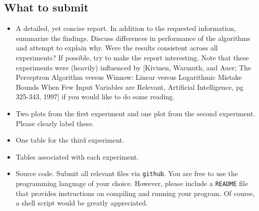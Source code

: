 \documentclass[12pt,letterpaper]{article}
\begin{document}
\begin{enumerate}
\end{enumerate}

\subsection*{What to submit}

\begin{itemize}
\item
A detailed, yet concise report.  In addition to the requested information, summarize the findings.  Discuss differences in performance of the algorithms and attempt to explain why.  Were the results consistent across all experiments?  If possible, try to make the report interesting.  Note that these experiments were (heavily) influenced by [Kivinen, Warmuth, and Auer; The Perceptron Algorithm versus Winnow: Linear versus Logarithmic Mistake Bounds When Few Input Variables are Relevant, Artificial Intelligence, pg 325-343, 1997] if you would like to do some reading.
\item
Two plots from the first experiment and one plot from the second experiment.  Please clearly label these.
\item
One table for the third experiment.
\item
Tables associated with each experiment.
\item
Source code.  Submit all relevant files via {\tt github}.  You are free to use the programming language of your choice.  However, please include a {\tt README} file that provides instructions on compiling and running your program.  Of course, a shell script would be greatly appreciated.
\end{itemize}
\end{document}
